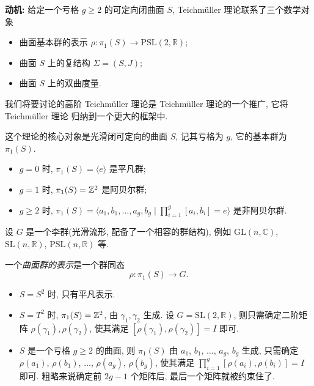 \textbf{动机:} 给定一个亏格 $g\geq 2$ 的可定向闭曲面 $S$, Teichmüller 理论联系了三个数学对象
\begin{itemize}
    \item 曲面基本群的表示 $\rho:\pi_1(S)\to \mathrm{PSL}(2,\mathbb{R})$; 
    \item 曲面 $S$ 上的复结构 $\Sigma = (S,J)$; 
    \item 曲面 $S$ 上的双曲度量.  
\end{itemize}
我们将要讨论的高阶 Teichmüller 理论是 Teichmüller 理论的一个推广, 它将 Teichmüller 理论
归纳到一个更大的框架中. 

这个理论的核心对象是光滑闭可定向的曲面 $S$, 记其亏格为 $g$, 它的基本群为 $\pi_1(S)$.
\begin{example}\hfill
    \begin{itemize}[leftmargin=*]
        \item $g=0$ 时, $\pi_1(S) = \langle e \rangle$ 是平凡群;
        \item $g=1$ 时, $\pi_1(S) = \mathbb{Z}^2$ 是阿贝尔群;
        \item $g\geq 2$ 时, $\pi_1(S) = \langle a_1,b_1,\ldots,a_g,b_g \mid \prod_{i=1}^g [a_i,b_i] = e\rangle$ 是非阿贝尔群.
    \end{itemize}
\end{example}
设 $G$ 是一个李群(光滑流形, 配备了一个相容的群结构), 例如 $\mathrm{GL}(n,\mathbb{C})$, $\mathrm{SL}(n,\mathbb{R})$, $\mathrm{PSL}(n,\mathbb{R})$ 等. 
\begin{definition}
    一个\emph{曲面群的表示}是一个群同态 
    \begin{equation*}
        \rho:\pi_1(S)\to G.
    \end{equation*}
\end{definition}
\begin{example}\hfill
    \begin{itemize}[leftmargin=*]
        \item $S = S^2$ 时, 只有平凡表示.
        \item $S = T^2$ 时, $\pi_1(S) = \mathbb{Z}^2$, 由 $\gamma_1,\gamma_2$ 生成. 
        设 $G = \mathrm{SL}(2,\mathbb{R})$, 则只需确定二阶矩阵 $\rho(\gamma_1),\rho(\gamma_2)$, 
        使其满足 $[\rho(\gamma_1),\rho(\gamma_2)] = I$ 即可.
        \item $S$ 是一个亏格 $g\geq 2$ 的曲面, 则 $\pi_1(S)$ 由 $a_1$, $b_1$, $\ldots$, $a_g$, $b_g$ 生成,
        只需确定 $\rho(a_1)$, $\rho(b_1)$, $\ldots$, $\rho(a_g)$, $\rho(b_g)$, 
        使其满足 $\prod_{i=1}^g [\rho(a_i),\rho(b_i)] = I$ 即可. 
        粗略来说确定前 $2g-1$ 个矩阵后, 最后一个矩阵就被约束住了.
    \end{itemize}
\end{example}
